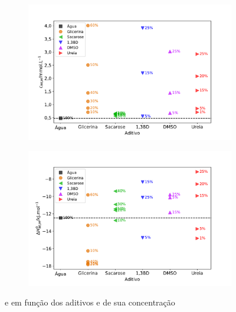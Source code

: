 			\begin{figure}[h]
				\begin{subfigure}[t]{0.5\textwidth}
					\centering
					\includegraphics[width=\textwidth]{imagens/itc/Cwlm_por_Aditivo}
					\caption{\cwlm{}}
					\label{fig:cwlm_por_aditivo}
				\end{subfigure}%
				\begin{subfigure}[t]{0.5\textwidth}
					\centering
					\includegraphics[width=\textwidth]{imagens/itc/DHwlm_por_Aditivo}
					\caption{\DHwlm{}}
					\label{fig:dhwlm_por_aditivo}
				\end{subfigure}
				\caption{\cwlm{} e \DHwlm{} em função dos aditivos e de sua concentração}
				\label{fig:cwlm_dhwlm_por_aditivo} %
			\end{figure} 
		
